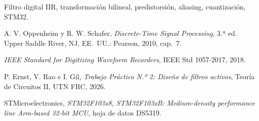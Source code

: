 \documentclass{plantilla}
\begin{document}
\maketitle

\begin{abstract}
En el Ejercicio~1 se identifica el filtro IIR grabado en una Blue Pill (STM32F103C8), que debe reemplazar al Sallen-Key del módulo de \SIrange{4}{20}{\milli\ampere} del TP2: pasa bajos Butterworth de segundo orden, $f_c = \SI{10}{\hertz}$ y ganancia unitaria. A partir de la caracterización estática, la respuesta al escalón y la respuesta en frecuencia se obtienen $H(s)$ y $H(z)$, se las compara con el Sallen-Key y se muestra el efecto del aliasing. En el Ejercicio~2 se diseña, por transformación bilineal con predistorsión, el equivalente digital del pasa banda del TP2 ($f_0 = \SI{28}{\kilo\hertz}$, $BW = \SI{1,7}{\kilo\hertz}$, $K = 9$) a $f_s = \SI{200}{\kilo\hertz}$. Para cumplir la especificación hay que predistorsionar los bordes de banda, y los coeficientes necesitan al menos \ejMinBits{} bits.
\end{abstract}

\begin{IEEEkeywords}
Filtro digital IIR, transformación bilineal, predistorsión, aliasing, cuantización, STM32.
\end{IEEEkeywords}






\begin{thebibliography}{99}
A. V. Oppenheim y R. W. Schafer, \emph{Discrete-Time Signal Processing}, 3.ª ed. Upper Saddle River, NJ, EE.~UU.: Pearson, 2010, cap.~7.

\emph{IEEE Standard for Digitizing Waveform Recorders}, IEEE Std 1057-2017, 2018.

P. Ernst, V. Rao e I. Gil, \emph{Trabajo Práctico N.º 2: Diseño de filtros activos}, Teoría de Circuitos II, UTN FRC, 2026.

STMicroelectronics, \emph{STM32F103x8, STM32F103xB: Medium-density performance line Arm-based 32-bit MCU}, hoja de datos DS5319.
\end{thebibliography}
\end{document}
